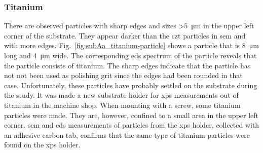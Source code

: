 \subsubsection{Titanium}
There are observed particles with sharp edges and sizes \SI{>5}{\micro\metre} in the upper left corner of the substrate. They appear darker than the \ac{czt} particles in \ac{sem} and with more edges. Fig.~\ref{fig:subAa_titanium-particle} shows a particle that is \SI{8}{\micro\metre} long and \SI{4}{\micro\metre} wide. The corresponding \ac{eds} spectrum of the particle reveals that the particle consists of titanium. The sharp edges indicate that the particle has not not been used as polishing grit since the edges had been rounded in that case. Unfortunately, these particles have probably settled on the substrate during the study. It was made a new substrate holder for \ac{xps} measurements out of titanium in the machine shop. When mounting with a screw, some titanium particles were made. They are, however, confined to a small area in the upper left corner. \Ac{sem} and \ac{eds} measurements of particles from the \ac{xps} holder, collected with an adhesive carbon tab, confirms that the same type of titanium particles were found on the \ac{xps} holder. %

\begin{comment}
\begin{figure}[htbp]
    \centering
    \subfigure[SEM image at a magnification of 12000$\times$.]{\texttt{[image: titan\_sem.jpg]}\label{fig:titan_sem}}
    \quad
    \subfigure[EDS.]{\texttt{[image: titan\_eds.jpg]}\label{fig:titan_eds}}
    \caption[]{Scanning electron microscopy (SEM) image and the corresponding \acf{eds} spectrum of a particle on substrate A at a magnification of 12000$\times$).}
    \label{fig:subA_Ti}
\end{figure}
\end{comment}

\begin{comment}
\begin{figure}[htbp]
    \centering
      \begin{minipage}[t]{0.49\linewidth}
        \centering
        \texttt{[image: subAa\_sem-holder\_b\_m001.jpg]}
      \end{minipage}
      \begin{minipage}[t]{0.49\linewidth}
        \centering
        \texttt{[image: unknown.png]}
      \end{minipage}
    \caption[\Ac{sem} image and corresponding \ac{eds} spectrum of titanium particle.]{A \ac{sem} image and the corresponding \ac{eds} spectrum of a titanium particle found on the holder used to transport substrates into the \ac{xps} chamber. The particles is \SI{8}{\micro\metre} long and consisting mainly of titanium. A carbon tab can be seen under the particle.}
    \label{fig:subAa_titanium}%
\end{figure}
\end{comment}

